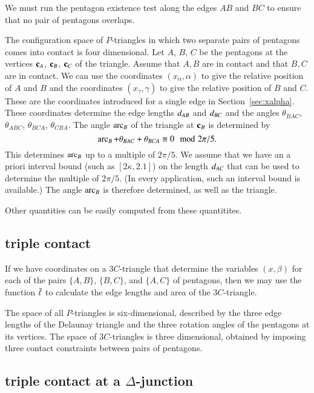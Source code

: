 We must run the pentagon existence test along the edges $AB$ and $BC$
to ensure that no pair of pentagons overlaps.

The configuration space of $P$-triangles in which two separate pairs
of pentagons comes into contact is four dimensional.  Let $A$, $B$,
$C$ be the pentagons at the vertices ${\mathbf c}_A$, ${\mathbf c}_B$, ${\mathbf c}_C$ of the
triangle.  Assume that $A,B$ are in contact and that $B,C$ are in
contact.  We can use the coordinates $(x_\alpha,\alpha)$ to give the
relative position of $A$ and $B$ and the coordinates
$(x_\gamma,\gamma)$ to give the relative position of $B$ and $C$.
These are the coordinates introduced for a single edge in
Section~\ref{sec:xalpha}.  These coordinates determine the edge
lengths $d_{AB}$ and $d_{BC}$ and the angles $\theta_{BAC}$,
$\theta_{ABC}$, $\theta_{BCA}$, $\theta_{CBA}$.  The angle $\operatorname{arc}_B$ of
the triangle at ${\mathbf c}_B$ is determined by
\[
\operatorname{arc}_B + \theta_{BAC} + \theta_{BCA} \equiv 0\mod 2\pi/5.
\]
This determines $\operatorname{arc}_B$ up to a multiple of $2\pi/5$.  We assume that
we have an a priori interval bound (such as $[2\kappa,2.1]$) on the
length $d_{AC}$ that can be used to determine the multiple of
$2\pi/5$.  (In every application, such an interval bound is
available.)  The angle $\operatorname{arc}_B$ is therefore determined, as well as
the triangle.

Other quantities can be easily computed from these  quantitites.  

\subsection{triple contact}

If we have coordinates on a $3C$-triangle that determine the variables
$(x,\beta)$ for each of the pairs $\{A,B\}$, $\{B,C\}$, and $\{A,C\}$
of pentagons, then we may use the function $\bar\ell$ to calculate the edge
lengths and area of the $3C$-triangle.

The space of all $P$-triangles is six-dimensional, described by the
three edge lengths of the Delaunay triangle and the three rotation
angles of the pentagons at its vertices.  The space of $3C$-triangles
is three dimensional, obtained by imposing three contact constraints
between pairs of pentagons.

\subsection{triple contact at a $\Delta$-junction}

